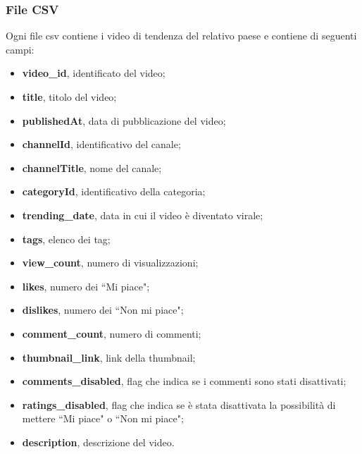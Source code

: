 \documentclass[10pt]{article}
\begin{document}
\subsubsection{File CSV}
Ogni file csv contiene i video di tendenza del relativo paese e contiene di seguenti campi:
\begin{itemize}
    \item \textbf{video\_id}, identificato del video;
    \item \textbf{title}, titolo del video;
    \item \textbf{publishedAt}, data di pubblicazione del video;
    \item \textbf{channelId}, identificativo del canale;
    \item \textbf{channelTitle}, nome del canale;
    \item \textbf{categoryId}, identificativo della categoria;
    \item \textbf{trending\_date}, data in cui il video è diventato virale;
    \item \textbf{tags}, elenco dei tag;
    \item \textbf{view\_count}, numero di visualizzazioni;
    \item \textbf{likes}, numero dei ``Mi piace";
    \item \textbf{dislikes}, numero dei ``Non mi piace";
    \item \textbf{comment\_count}, numero di commenti;
    \item \textbf{thumbnail\_link}, link della thumbnail;
    \item \textbf{comments\_disabled}, flag che indica se i commenti sono stati disattivati;
    \item \textbf{ratings\_disabled}, flag che indica se è stata disattivata la possibilità di mettere ``Mi piace" o ``Non mi piace";
    \item \textbf{description}, descrizione del video.
\end{itemize}
\end{document}
